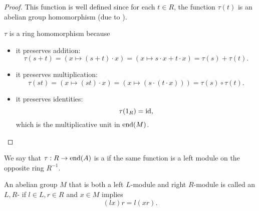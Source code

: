 \begin{proof}
  This function is well defined since for each \( t \in R \), the function \( \tau(t) \) is an abelian group homomorphism (due to ).

  \( \tau \) is a ring homomorphism because
  \begin{itemize}
    \item it preserves addition:
    \begin{equation*}
      \tau(s + t)
      =
      (x \mapsto (s + t) \cdot x)
      =
      (x \mapsto s \cdot x + t \cdot x)
      =
      \tau(s) + \tau(t).
    \end{equation*}

    \item it preserves multiplication:
    \begin{equation*}
      \tau(st)
      =
      (x \mapsto (st) \cdot x)
      =
      (x \mapsto (s \cdot (t \cdot x)))
      =
      \tau(s) \circ \tau(t).
    \end{equation*}

    \item it preserves identities:
    \begin{equation*}
      \tau(1_R)
      =
      \operatorname{id},
    \end{equation*}
    which is the multiplicative unit in \( \operatorname{end}(M) \).
  \end{itemize}
\end{proof}

\begin{definition}\label{def:right_module}
  We say that \( \tau: R \to \operatorname{end}(A) \) is a  if the same function is a left module on the opposite ring \( R^{-1} \).
\end{definition}

\begin{definition}\label{def:bimodule}
  An abelian group \( M \) that is both a left \( L \)-module and right \( R \)-module is called an \( L, R \)- if \( l \in L, r \in R \) and \( x \in M \) implies
  \begin{equation*}
    (lx)r = l(xr).
  \end{equation*}
\end{definition}

